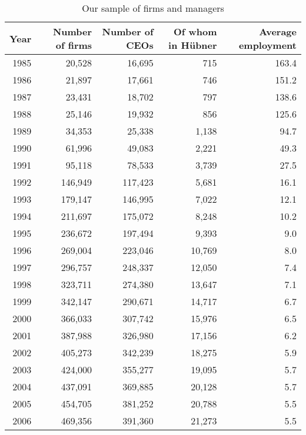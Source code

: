 \begin{table}[ht!]\centering\caption{Our sample of firms and managers}\label{tab:sample}\begin{tabular}{rrrrr}\toprule
Year &
\multicolumn{1}{p{1in}}{\centering Number of firms} &
\multicolumn{1}{p{1in}}{\centering Number of CEOs} &
\multicolumn{1}{p{1in}}{\centering Of whom in Hübner} &
\multicolumn{1}{p{1in}}{\centering Average employment} \\
\midrule1985 &       20,528 &       16,695 &          715 & 163.4 \\
1986 &       21,897 &       17,661 &          746 & 151.2 \\
1987 &       23,431 &       18,702 &          797 & 138.6 \\
1988 &       25,146 &       19,932 &          856 & 125.6 \\
1989 &       34,353 &       25,338 &        1,138 &  94.7 \\
1990 &       61,996 &       49,083 &        2,221 &  49.3 \\
1991 &       95,118 &       78,533 &        3,739 &  27.5 \\
1992 &      146,949 &      117,423 &        5,681 &  16.1 \\
1993 &      179,147 &      146,995 &        7,022 &  12.1 \\
1994 &      211,697 &      175,072 &        8,248 &  10.2 \\
1995 &      236,672 &      197,494 &        9,393 &   9.0 \\
1996 &      269,004 &      223,046 &       10,769 &   8.0 \\
1997 &      296,757 &      248,337 &       12,050 &   7.4 \\
1998 &      323,711 &      274,380 &       13,647 &   7.1 \\
1999 &      342,147 &      290,671 &       14,717 &   6.7 \\
2000 &      366,033 &      307,742 &       15,976 &   6.5 \\
2001 &      387,988 &      326,980 &       17,156 &   6.2 \\
2002 &      405,273 &      342,239 &       18,275 &   5.9 \\
2003 &      424,000 &      355,277 &       19,095 &   5.7 \\
2004 &      437,091 &      369,885 &       20,128 &   5.7 \\
2005 &      454,705 &      381,252 &       20,788 &   5.5 \\
2006 &      469,356 &      391,360 &       21,273 &   5.5 \\

\end{tabular}
\end{table}
